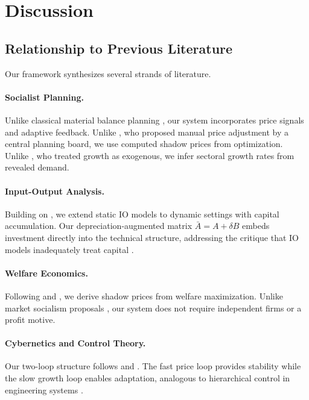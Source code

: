 \section{Discussion}
\label{sec:discussion}

\subsection{Relationship to Previous Literature}

Our framework synthesizes several strands of literature.

\paragraph{Socialist Planning.}
Unlike classical material balance planning
\citep{montias1959planning}, our system incorporates price signals and
adaptive feedback.
Unlike \citet{lange1936economic}, who proposed manual price adjustment
by a central planning board, we use computed shadow prices from
optimization.
Unlike \citet{kantorovich1965best}, who treated growth as exogenous,
we infer sectoral growth rates from revealed demand.

\paragraph{Input-Output Analysis.}
Building on \citet{leontief1986input}, we extend static IO models to
dynamic settings with capital accumulation.
Our depreciation-augmented matrix $\bar{A} = A + \delta B$ embeds investment
directly into the technical structure, addressing the critique that IO
models inadequately treat capital \citep{kurz2003theory}.

\paragraph{Welfare Economics.}
Following \citet{lange1942foundations} and \citet{lerner1944economics},
we derive shadow prices from welfare maximization.
Unlike market socialism proposals \citep{roemer1994future}, our system
does not require independent firms or a profit motive.

\paragraph{Cybernetics and Control Theory.}
Our two-loop structure follows \citet{beer1981brain} and
\citet{mesarovic1970theory}.
The fast price loop provides stability while the slow growth loop
enables adaptation, analogous to hierarchical control in engineering
systems \citep{doyle1992feedback}.

